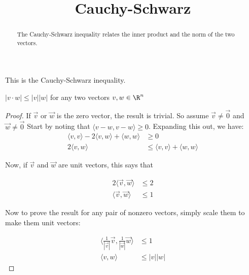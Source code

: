 \documentclass{ximera}
\title{Cauchy-Schwarz}
\begin{document}
\begin{abstract}
  The Cauchy-Schwarz inequality relates the inner product and the norm of the two vectors.
\end{abstract}

This is the Cauchy-Schwarz inequality.

\begin{theorem}
  $|v \cdot w| \leq |v||w|$ for any two vectors $v,w \in \R^n$
\end{theorem} 
 
\begin{proof}
  If $\vec{v}$ or $\vec{w}$ is the zero vector, the result is trivial.  So assume $\vec{v} \neq \vec{0}$ and $\vec{w} \neq \vec{0}$
  Start by noting that $\langle v-w,v-w\rangle \geq 0 $.  Expanding this out, we have:
  \begin{align*}
  \langle v,v \rangle - 2 \langle v,w \rangle +\langle  w,w\rangle &\geq 0 \\
  2\langle v,w \rangle &\leq \langle v,v \rangle  + \langle w,w\rangle
  \end{align*}
  
  Now, if $\vec{v}$ and $\vec{w}$ are unit vectors, this says that
  
  \begin{align*}
  2\langle \vec{v}, \vec{w} \rangle &\leq 2 \\
  \langle \vec{v},\vec{w}\rangle &\leq 1
  \end{align*}
  
  Now to prove the result for any pair of nonzero vectors, simply scale them to make them unit vectors:
  
  \begin{align*}
  \langle \frac{1}{|\vec{v}|}\vec{v},\frac{1}{|\vec{w}|}\vec{w}\rangle &\leq 1\\
  \langle v,w\rangle &\leq  |v||w|
  \end{align*}
  
\end{proof}
\end{document}
